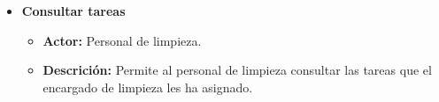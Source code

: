\documentclass[spanish,a4paper,12pt]{report}		%
\begin{document}
\begin{itemize}

	\hspace{0.7 true cm}
		\item \textbf{Consultar tareas}				
				\begin{itemize}
					\item \textbf{Actor: }Personal de limpieza.
					\item \textbf{Descrición: }Permite al personal de limpieza consultar las tareas que el encargado de limpieza les ha asignado. 		
				\end {itemize}



\end{itemize}
\end{document}
